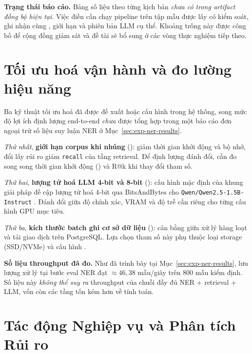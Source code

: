 \textbf{Trạng thái báo cáo.} Bảng số liệu theo từng kịch bản \emph{chưa có trong artifact đồng bộ hiện tại}. Việc điền cần chạy pipeline trên tập mẫu được lấy có kiểm soát, ghi nhận cùng , giới hạn  và phiên bản LLM cụ thể. Khoảng trống này được công bố để cộng đồng giám sát và đề tài sẽ bổ sung ở các vòng thực nghiệm tiếp theo.

\section{Tối ưu hoá vận hành và đo lường hiệu năng}
\label{sec:exp-optim}

Ba kỹ thuật tối ưu hoá đã được đề xuất hoặc cấu hình trong hệ thống, song mức độ lợi ích định lượng end-to-end \emph{chưa} được tổng hợp trong một báo cáo đơn ngoại trừ số liệu suy luận NER ở Mục~\ref{sec:exp-ner-results}.

\emph{Thứ nhất}, \textbf{giới hạn corpus khi nhúng} (): giảm thời gian khởi động và bộ nhớ, đổi lấy rủi ro giảm \texttt{recall} của tầng retrieval. Để định lượng đánh đổi, cần đo song song thời gian khởi động () và R@k khi thay đổi tham số.

\emph{Thứ hai}, \textbf{lượng tử hoá LLM 4-bit và 8-bit} (): cấu hình mặc định của khung giải pháp đề cập lượng tử hoá 4-bit qua BitsAndBytes \cite{Dettmers2022BNB} cho \texttt{Qwen/Qwen2.5-1.5B-Instruct} \cite{QwenTeam2024}. Đánh đổi giữa độ chính xác, VRAM và độ trễ cần  riêng cho từng cấu hình GPU mục tiêu.

\emph{Thứ ba}, \textbf{kích thước batch ghi cơ sở dữ liệu} (): cân bằng giữa  xử lý hàng loạt và tải giao dịch trên PostgreSQL. Lựa chọn tham số này phụ thuộc loại storage (SSD/NVMe) và cấu hình .

\textbf{Số liệu throughput đã đo.} Như đã trình bày tại Mục~\ref{sec:exp-ner-results}, lưu lượng xử lý tại bước eval NER đạt \(\approx 46{,}38\) mẫu/giây trên 800 mẫu kiểm định. Số liệu này \emph{không thể suy ra} throughput của chuỗi đầy đủ NER + retrieval + LLM, vốn còn các tầng tốn kém hơn về tính toán.

\section{Tác động Nghiệp vụ và Phân tích Rủi ro}
\label{sec:exp-business}

